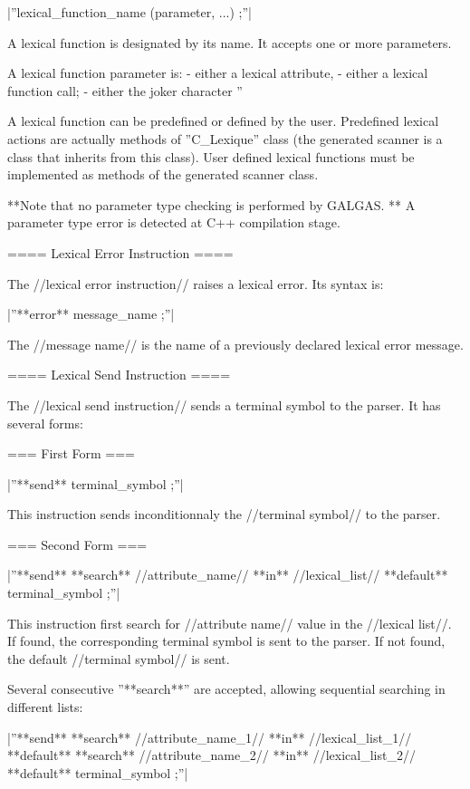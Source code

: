 {|''lexical\_function\_name (parameter, ...) ;''|

A lexical function is designated by its name. It accepts one or more parameters.

A lexical function parameter is:
  - either a lexical attribute,
  - either a lexical function call;
  - either the joker character ''%

A lexical function can be predefined or defined by the user. Predefined lexical actions are actually methods of ''C\_Lexique'' class (the generated scanner is a class that inherits from this class). User defined lexical functions must be implemented as methods of the generated scanner class.

**Note that no parameter type checking is performed by GALGAS. ** A parameter type error is detected at C++ compilation stage.
 
==== Lexical Error Instruction ====

The //lexical error instruction// raises a lexical error. Its syntax is:

|''**error** message\_name ;''|

The //message name// is the name of a previously declared lexical error message.

==== Lexical Send Instruction ====

The //lexical send instruction// sends a terminal symbol to the parser. It has several forms:

=== First Form ===

|''**send** terminal\_symbol ;''|

This instruction sends inconditionnaly the //terminal symbol// to the parser.

=== Second Form ===

|''**send** **search** //attribute\_name// **in** //lexical\_list// **default** terminal\_symbol ;''|

This instruction first search for //attribute name// value in the //lexical list//. If found, the corresponding terminal symbol is sent to the parser. If not found, the default //terminal symbol// is sent.

Several consecutive ''**search**'' are accepted, allowing sequential searching in different lists:

|''**send** **search** //attribute\_name\_1// **in** //lexical\_list\_1// **default** **search** //attribute\_name\_2// **in** //lexical\_list\_2// **default** terminal\_symbol ;''|

}
